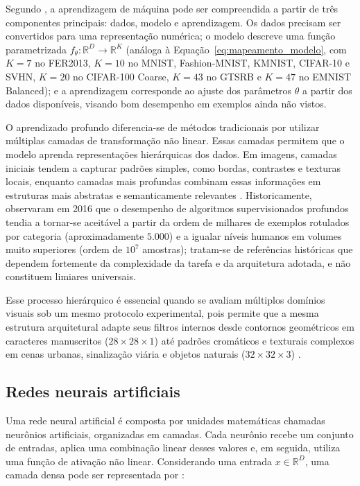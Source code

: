 \documentclass[
    12pt,
    openright,
    oneside,
    a4paper,
    english,
    brazil
]{abntex2}
\begin{document}
Segundo , a aprendizagem de máquina pode ser compreendida a partir de três componentes principais: dados, modelo e aprendizagem. Os dados precisam ser convertidos para uma representação numérica; o modelo descreve uma função parametrizada \(f_{\theta}: \mathbb{R}^{D} \rightarrow \mathbb{R}^{K}\) (análoga à Equação~\eqref{eq:mapeamento_modelo}, com \(K=7\) no FER2013, \(K=10\) no MNIST, Fashion-MNIST, KMNIST, CIFAR-10 e SVHN, \(K=20\) no CIFAR-100 Coarse, \(K=43\) no GTSRB e \(K=47\) no EMNIST Balanced); e a aprendizagem corresponde ao ajuste dos parâmetros \(\theta\) a partir dos dados disponíveis, visando bom desempenho em exemplos ainda não vistos.

O aprendizado profundo diferencia-se de métodos tradicionais por utilizar múltiplas camadas de transformação não linear. Essas camadas permitem que o modelo aprenda representações hierárquicas dos dados. Em imagens, camadas iniciais tendem a capturar padrões simples, como bordas, contrastes e texturas locais, enquanto camadas mais profundas combinam essas informações em estruturas mais abstratas e semanticamente relevantes \cite{LeCun2015,goodfellow2016deep,ponti2017comofunciona}. Historicamente,  observaram em 2016 que o desempenho de algoritmos supervisionados profundos tendia a tornar-se aceitável a partir da ordem de milhares de exemplos rotulados por categoria (aproximadamente \(5.000\)) e a igualar níveis humanos em volumes muito superiores (ordem de \(10^7\) amostras); tratam-se de referências históricas que dependem fortemente da complexidade da tarefa e da arquitetura adotada, e não constituem limiares universais.

Esse processo hierárquico é essencial quando se avaliam múltiplos domínios visuais sob um mesmo protocolo experimental, pois permite que a mesma estrutura arquitetural adapte seus filtros internos desde contornos geométricos em caracteres manuscritos (\(28 \times 28 \times 1\)) até padrões cromáticos e texturais complexos em cenas urbanas, sinalização viária e objetos naturais (\(32 \times 32 \times 3\)) \cite{LeCun2015,goodfellow2016deep}.

\subsection{Redes neurais artificiais}

Uma rede neural artificial é composta por unidades matemáticas chamadas neurônios artificiais, organizadas em camadas. Cada neurônio recebe um conjunto de entradas, aplica uma combinação linear desses valores e, em seguida, utiliza uma função de ativação não linear. Considerando uma entrada \(x \in \mathbb{R}^{D}\), uma camada densa pode ser representada por \cite{goodfellow2016deep,ponti2017comofunciona}:
\end{document}
